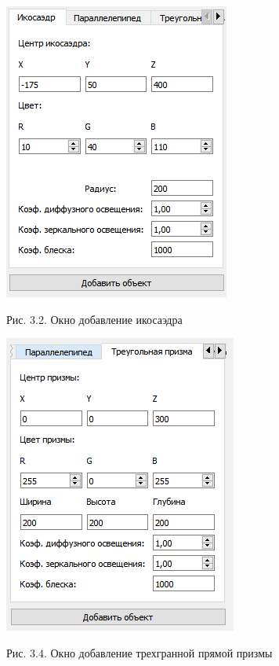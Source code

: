 \documentclass[12pt]{report}
\begin{document}
	\begin{minipage}{0.5\textwidth}
			\begin{center}
				\includegraphics[scale=0.8]{ico.png}
				
				Рис. 3.2. Окно добавление икосаэдра
			\end{center}
	\end{minipage}
	\hfill
	\begin{minipage}{0.5\textwidth}
		\begin{center}
			\includegraphics[scale=0.8]{prism.png}
			
			Рис. 3.4. Окно добавление трехгранной прямой призмы
		\end{center}
	\end{minipage}
\end{document}
